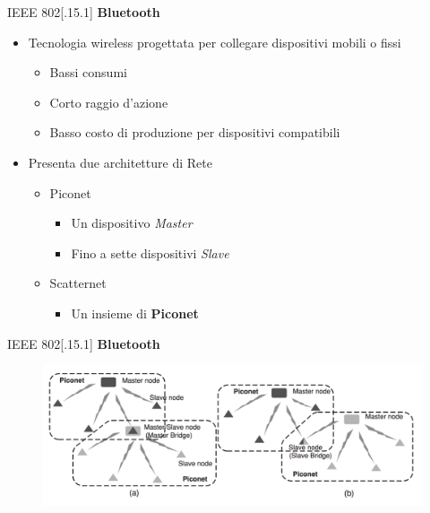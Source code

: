 \begin{frame}{IEEE 802[.15.1]}
	\textbf{Bluetooth}
	\begin{itemize}[<+- | alert@+>]
		\item Tecnologia wireless progettata per collegare dispositivi mobili o fissi
			\begin{itemize}[<+- | alert@+>]
				\item Bassi consumi
				\item Corto raggio d'azione
				\item Basso costo di produzione per dispositivi compatibili
			\end{itemize}
			\item Presenta due architetture di Rete
			\begin{itemize}[<+- | alert@+>]
				\item Piconet
				\begin{itemize}
					\item Un dispositivo \textit{Master}
					\item Fino a sette dispositivi \textit{Slave}
				\end{itemize}
				\item Scatternet
				\begin{itemize}[<+- | alert@+>]
					\item Un insieme di \textbf{Piconet}
				\end{itemize}
			\end{itemize}
	\end{itemize}		
\end{frame}


\begin{frame}{IEEE 802[.15.1]}
\textbf{Bluetooth}
	\begin{figure}[h] 
		\includegraphics[scale=0.3,cfbox=blue_slides 1pt 0pt]{imgs/bt.png}
	\end{figure}
\end{frame}

